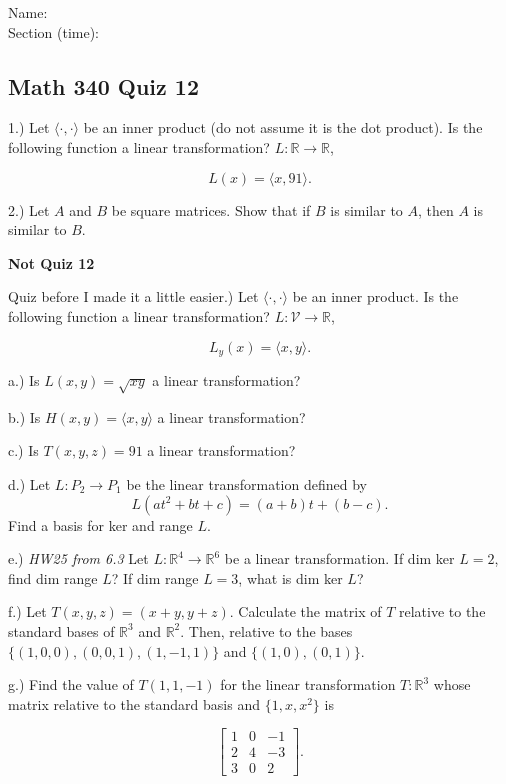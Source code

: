 \documentclass{article}
\begin{document}
Name:\\
\medskip
Section (time):

\subsection*{Math 340 Quiz 12}


1.) Let $\langle \cdot, \cdot \rangle$ be an inner product (do not assume it is the dot product). Is the following function a linear transformation? $L:\mathbb{R}\rightarrow \mathbb{R}$, 

$$L(x) = \langle x, 91\rangle .$$



2.) Let $A$ and $B$ be square matrices. Show that if $B$ is similar to $A$, then $A$ is similar to $B$. 


\pagebreak
\textbf{Not Quiz 12}

Quiz before I made it a little easier.) Let $\langle \cdot, \cdot \rangle$ be an inner product. Is the following function a linear transformation? $L:\mathcal{V}\rightarrow \mathbb{R}$, 

$$L_y(x) = \langle x, y\rangle .$$

a.) Is $L(x,y) = \sqrt{xy}$ a linear transformation?

b.) Is $H(x,y) = \langle x, y \rangle $ a linear transformation?

c.) Is $T(x,y,z) = 91$ a linear transformation? 

d.) Let $L:P_2\rightarrow P_1$ be the linear transformation defined by $$L(at^2 + bt + c) = (a+b)t + (b-c).$$ Find a basis for ker and range $L$. 

e.) \emph{HW25 from 6.3} Let $L:\mathbb{R}^4 \rightarrow \mathbb{R}^6$ be a linear transformation. If dim ker $L=2$, find dim range $L$? If dim range $L=3$, what is dim ker $L$?


f.) Let $T(x,y,z) = (x+y, y+z)$. Calculate the matrix of $T$ relative to the standard bases of $\mathbb{R}^3$ and $\mathbb{R}^2$. Then, relative to the bases $\{(1,0,0), (0,0,1), (1,-1,1)\}$ and $\{(1,0), (0,1)\}$. 

g.) Find the value of $T(1,1,-1)$ for the linear transformation $T: \mathbb{R}^3$ whose matrix relative to the standard basis and $\{1, x, x^2\}$ is 

$$\left[ \begin{array}{ccc}

1 & 0 & -1\\
2 & 4 & -3\\
3 & 0 & 2
\end{array} \right].$$
\end{document}
